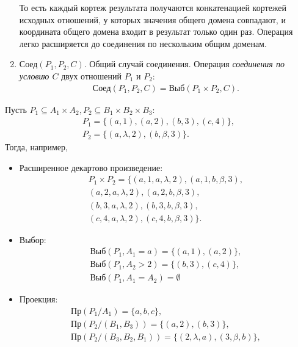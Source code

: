 \begin{enumerate}
    То есть каждый кортеж результата получаются конкатенацией кортежей исходных отношений, у которых значения общего домена совпадают, и координата общего домена входит в результат только один раз. Операция легко расширяется до соединения по нескольким общим доменам.
    
    \item $\text{Соед}(P_1,P_2,C)$. Общий случай соединения. Операция \emph{соединения по условию $C$} двух отношений $P_1$ и $P_2$:
    \[
        \begin{split}
            \text{Соед}(P_1,P_2,C)=\text{Выб}(P_1\times P_2,C).
        \end{split}
    \]
\end{enumerate}


\begin{exampl}
    Пусть $P_1\subseteq A_1\times A_2, P_2\subseteq B_1\times B_2\times B_3$:
    \[
        \begin{split}
            P_1=\{(a,1),(a,2),(b,3),(c,4)\},\\
            P_2=\{(a,\lambda,2),(b,\beta,3)\}.
        \end{split}
    \]
    Тогда, например, 
    \begin{itemize}
        \item Расширенное декартово произведение:
        \[
            \begin{split}
                P_1\times P_2=\{
                    (a,1,a,\lambda,2),(a,1,b,\beta,3),\\
                    (a,2,a,\lambda,2),(a,2,b,\beta,3),\\
                    (b,3,a,\lambda,2),(b,3,b,\beta,3),\\ 
                    (c,4,a,\lambda,2),(c,4,b,\beta,3)
                \}.
            \end{split}
        \]
        
        \item Выбор:
        \[
            \begin{split}
                \text{Выб}(P_1,A_1=a)=\{(a,1),(a,2)\},\\
                \text{Выб}(P_1,A_2>2)=\{(b,3),(c,4)\},\\
                \text{Выб}(P_1,A_1=A_2)=\emptyset
            \end{split}
        \]
        
        \item Проекция:
        \[
            \begin{split}
                \text{Пр}(P_1/A_1)=\{a,b,c\},\\
                \text{Пр}(P_2/(B_1,B_3))=\{(a,2),(b,3)\}, \\            
                \text{Пр}(P_2/(B_3,B_2,B_1))=\{(2,\lambda,a),(3,\beta,b)\}, \\
            \end{split}
        \]
        

\end{itemize}
\end{exampl}
